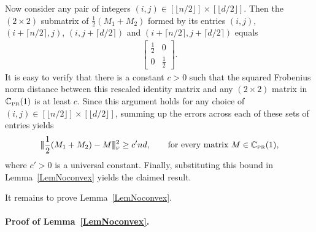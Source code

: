 \documentclass[11pt, hidelinks]{article} %
\newcommand{\matsnorm}[2]{|\!|\!| #1 | \! | \!|_{{#2}}}
\newcommand{\frobnorm}[1]{\ensuremath{\matsnorm{#1}{\mbox{\tiny{F}}}}}
\newcommand{\hausDis}{\mathcal{H}}
\newcommand{\defn}{\ensuremath{:\,=}}
\newcommand{\half}{\ensuremath{{\frac{1}{2}}}}
\newcommand{\numrows}{n}
\newcommand{\numcols}{d}
\newcommand{\plaincon}{c}
\newcommand{\wtmatrix}{M}
\newcommand{\wt}{\wtmatrix}
\newcommand{\matrixset}{\mathbb{C}}
\newcommand{\permset}{\matrixset_{\mbox{\tiny PR}}}
\newcommand{\permone}{\permset(1)}
\newcommand{\convexclass}{\ensuremath{\mathbb{C}}}
\newcommand{\genclass}{\ensuremath{\mathbb{S}}}
\begin{document}
Now consider any pair of integers $(i,j) \in [\lfloor \numrows/2
  \rfloor] \times [\lfloor \numcols/2 \rfloor ]$. Then the $(2 \times
2)$ submatrix of $\frac{1}{2}(\wt_1 + \wt_2)$ formed by its entries
$(i,j)$, $(i + \lceil \numrows/2 \rceil, j)$, $(i, j+ \lceil
\numcols/2 \rceil)$ and $(i + \lceil \numrows/2 \rceil, j+ \lceil
\numcols/2 \rceil)$ equals
\begin{align*}
\begin{bmatrix}
\half & 0 \\ 0 & \half
\end{bmatrix}.
\end{align*}
It is easy to verify that there is a constant $\plaincon>0$ such that
the squared Frobenius norm distance between this rescaled identity
matrix and any $(2 \times 2)$ matrix in $\permone$ is at least
$\plaincon$. Since this argument holds for any choice of $(i,j) \in
[\lfloor \numrows/2 \rfloor] \times [\lfloor \numcols/2 \rfloor ]$,
summing up the errors across each of these sets of entries yields
\begin{align*}
\frobnorm{\half (\wt_1 + \wt_2) - \wt}^2 \geq \plaincon' \numrows
\numcols, \qquad \mbox{for every matrix $\wt \in \permone$},
\end{align*}
where $\plaincon' > 0$ is a universal constant. Finally, substituting
this bound in Lemma~\ref{LemNoconvex} yields the claimed result.

It remains to prove Lemma~\ref{LemNoconvex}.


\paragraph{Proof of Lemma~\ref{LemNoconvex}.}
%
\end{document}
